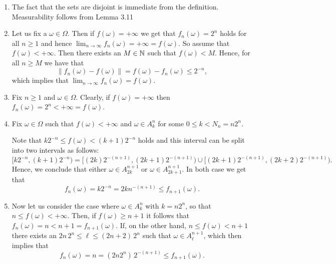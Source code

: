 \begin{enumerate}[label={(\alph*)}]
\item The fact that the sets are disjoint is immediate from the definition. Measurability follows from Lemma 3.11
\item Let us fix a $\omega \in \Omega$. Then if $f(\omega) = +\infty$ we get that $f_n(\omega) = 2^n$ holds for all $n \ge 1$ and hence $\lim_{n \to \infty} f_n(\omega) = +\infty = f(\omega)$. So assume that $f(\omega) < +\infty$. Then there exists an $M \in \mathbb N$ such that $f(\omega) < M$. Hence, for all $n \ge M$ we have that 
\[
	\|f_n(\omega) - f(\omega)\| = f(\omega) - f_n(\omega) \le 2^{-n},
\]
which implies that $\lim_{n \to \infty} f_n(\omega) = f(\omega)$.
\item Fix $n \ge 1$ and $\omega \in \Omega$. Clearly, if $f(\omega) = +\infty$ then $f_n(\omega) = 2^n < +\infty = f(\omega)$. 

\item Fix $\omega \in \Omega$ such that $f(\omega) < +\infty$ and $\omega \in A_k^n$ for some $0 \le k < N_n = n 2^n$. 

Note that $k 2^{-n} \le f(\omega) < (k+1) 2^{-n}$ holds and this interval can be split into two intervals as follows:
\[
	[k 2^{-n}, (k+1) 2^{-n}) = [(2k) 2^{-(n+1)}, (2k +1)2^{-(n+1)}) \cup [(2k +1)2^{-(n+1)}, (2k + 2)2^{-(n+1)}).
\] 
Hence, we conclude that either $\omega \in A_{2k}^{n+1}$ or $\omega \in A_{2k+1}^{n+1}$. In both case we get that 
\[
	f_n(\omega) = k2^{-n} = 2k n^{-(n+1)} \le f_{n+1}(\omega).
\]

\item Now let us consider the case where $\omega \in A_k^n$ with $k = n 2^n$, so that $n \le f(\omega) < +\infty$. Then, if $f(\omega) \ge n + 1$ it follows that $f_n(\omega) = n < n + 1 = f_{n+1}(\omega)$. If, on the other hand, $n \le f(\omega) < n + 1$ there exists an $2n \, 2^n \le \ell \le (2n+2) \, 2^n$ such that $\omega \in A_\ell^{n+1}$, which then implies that 
\[
	f_n(\omega) = n = (2n 2^{n}) \, 2^{-(n+1)} \le f_{n+1}(\omega).
\]
\end{enumerate}

\bigskip

